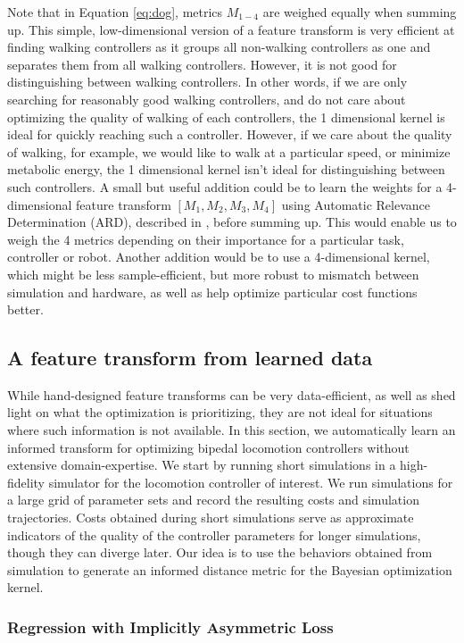 Note that in Equation \ref{eq:dog}, metrics $M_{1-4}$ are weighed equally when summing up. This simple, low-dimensional version of a feature transform is very efficient at finding walking controllers as it groups all non-walking controllers as one and separates them from all walking controllers. However, it is not good for distinguishing between walking controllers. In other words, if we are only searching for reasonably good walking controllers, and do not care about optimizing the quality of walking of each controllers, the 1 dimensional kernel is ideal for quickly reaching such a controller. However, if we care about the quality of walking, for example, we would like to walk at a particular speed, or minimize metabolic energy, the 1 dimensional kernel isn't ideal for distinguishing between such controllers.
A small but useful addition could be to learn the weights for a 4-dimensional feature transform $[M_1, M_2, M_3, M_4]$ using Automatic Relevance Determination (ARD), described in \cite{GPsMLBook}, before summing up. This would enable us to weigh the 4 metrics depending on their importance for a particular task, controller or robot. Another addition would be to use a 4-dimensional kernel, which might be less sample-efficient, but more robust to mismatch between simulation and hardware, as well as help optimize particular cost functions better. 


\subsection{A feature transform from learned data}
\label{sec:nn_transform}
While hand-designed feature transforms can be very data-efficient, as well as shed light on what the optimization is prioritizing, they are not ideal for situations where such information is not available. In this section, we automatically learn an informed transform for optimizing bipedal locomotion controllers without extensive domain-expertise. We start by running short simulations in a high-fidelity simulator for the locomotion controller of interest. 
We run simulations for a large grid of parameter sets and record the resulting costs and simulation trajectories. Costs obtained during short simulations serve as approximate indicators of the quality of the controller parameters for longer simulations, though they can diverge later. Our idea is to use the behaviors obtained from simulation to generate an informed distance metric for the Bayesian optimization kernel. 

\subsubsection{Regression with Implicitly Asymmetric Loss}
\label{sec:approach_asym}

